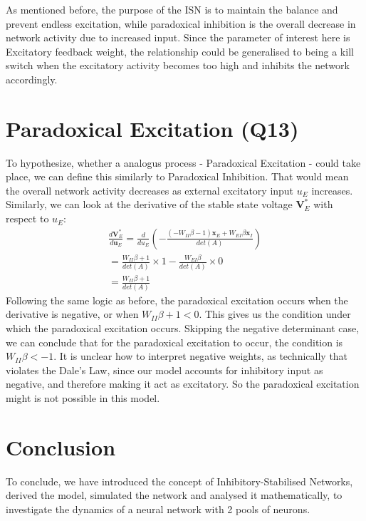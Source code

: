 \documentclass[10pt,twocolumn]{article}
\begin{document}
As mentioned before, the purpose of the ISN is to maintain the balance
and prevent endless excitation, while paradoxical inhibition is the overall
decrease in network activity due to increased input. Since the parameter 
of interest here is Excitatory feedback weight, the relationship could
be generalised to being a kill switch when the excitatory activity
becomes too high and inhibits the network accordingly.

\section{Paradoxical Excitation (Q13)}
To hypothesize, whether a analogus process - Paradoxical Excitation - could take place,
we can define this similarly to Paradoxical Inhibition. That would mean
the overall network activity decreases as external excitatory input $u_E$
increases. Similarly, we can look at the derivative of the stable state 
voltage $\textbf{V}^\ast_E$ with respect to $u_E$:
$$
    \begin{gathered}
        \frac{d\textbf{V}^\ast_E}{d\textbf{u}_E}
        = \frac{d}{du_E}\left(-\frac{(-W_{II}\beta-1) \textbf{x}_E + W_{EI}\beta \textbf{x}_I}{det(A)}\right)\\
        = \frac{W_{II}\beta+1}{det(A)}\times 1 
        - \frac{W_{EI}\beta}{det(A)}\times 0\\
        = \boxed{\frac{W_{II}\beta+1}{det(A)}}
    \end{gathered}
$$
Following the same logic as before, the paradoxical excitation occurs
when the derivative is negative, or when $W_{II}\beta + 1 < 0$.
This gives us the condition under which the paradoxical excitation occurs.
Skipping the negative determinant case, we can conclude that for the
paradoxical excitation to occur, the condition is $W_{II}\beta < -1$.
It is unclear how to interpret negative weights, as technically
that violates the Dale's Law, since our model accounts for inhibitory
input as negative, and therefore making it act as excitatory. 
So the paradoxical excitation might is not possible in this model.

\section{Conclusion}
To conclude, we have introduced the concept of Inhibitory-Stabilised Networks,
derived the model, simulated the network and analysed it mathematically, to investigate
 the dynamics of a neural network with 2 pools of neurons.
\end{document}
